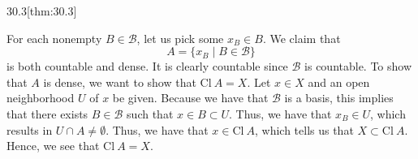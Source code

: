 \begin{thmBox}{30.3}[thm:30.3]
\begin{proofBox}
        \baseSkip

        For each nonempty \( B \in \mathcal{B} \), let us pick some 
        \( x_{ B } \in B \).
        We claim that 
        \begin{equation*}
            A
            =
            \{ x_{ B } \mid B \in \mathcal{B} \}
        \end{equation*}
        is both countable and dense.
        It is clearly countable since \( \mathcal{B} \) is countable.
        To show that \( A \) is dense, we want to show that 
        \( \mathrm{Cl} \ A = X \).
        Let \( x \in X \) and an open neighborhood \( U \) of \( x \) be given.
        Because we have that \( \mathcal{B} \) is a basis, this implies that 
        there exists
        \( B \in \mathcal{B} \) such that \( x \in B \subset U \).
        Thus, we have that \( x_{ B } \in U \), which results in 
        \( U \cap A \neq \emptyset \).
        Thus, we have that \( x \in \mathrm{Cl} \ A \), which tells us 
        that \( X \subset \mathrm{Cl} \ A \).
        Hence, we see that \( \mathrm{Cl} \ A = X \).
    \end{proofBox}
\end{thmBox}

